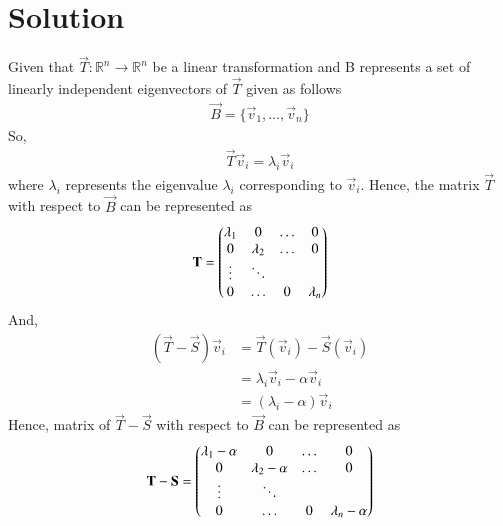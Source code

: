 \documentclass[journal,12pt]{IEEEtran}
\begin{document}
\section{Solution}
Given that $\vec{T}: \mathbb R^n \rightarrow \mathbb R^n$ be a linear transformation and B represents a set of linearly independent eigenvectors of $\vec{T}$ given as follows
\begin{align}
    \vec{B} = \{\vec{v}_1,\ldots,\vec{v}_n\}
\end{align}
So,
\begin{align}
    \vec{T}\vec{v}_i = \lambda_i\vec{v}_i
\end{align}
where $\lambda_i$ represents the eigenvalue $\lambda_i$ corresponding to $\vec{v}_i$. Hence, the matrix $\vec{T}$ with respect to $\vec{B}$ can be represented as
\begin{align}
    \mathbf{T} = \begin{pmatrix}\lambda_1 & 0 & \dots & 0\\ 0 & \lambda_2 & \dots & 0\\ \vdots & \ddots &  & \\ 0 & \dots & 0 & \lambda_n\end{pmatrix}\label{eq:T}
\end{align}
And,
\begin{align}
    (\vec{T}-\vec{S})\vec{v}_i & = \vec{T}(\vec{v}_i) - \vec{S}(\vec{v}_i)\\& = \lambda_i\vec{v}_i - \alpha\vec{v}_i \\ & = (\lambda_i - \alpha)\vec{v}_i
\end{align}
Hence, matrix of $\vec{T}-\vec{S}$ with respect to $\vec{B}$ can be represented as
\begin{align}
    \mathbf{T}-\mathbf{S} = \begin{pmatrix}\lambda_1-\alpha & 0 & \dots & 0\\ 0 & \lambda_2-\alpha & \dots & 0\\ \vdots & \ddots &  & \\ 0 & \dots & 0 & \lambda_n-\alpha\end{pmatrix}\label{eq:T-S}
\end{align}
\renewcommand{\thetable}{1}
\end{document}
